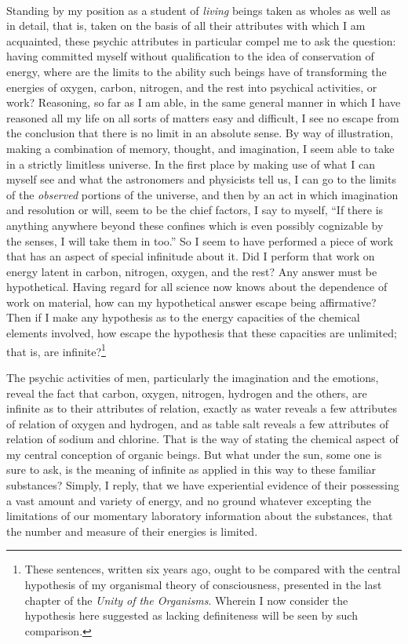 \documentclass[a4paper, 11pt, oneside, polutonikogreek, english]{article}
\begin{document}
\paragraph{}
Standing by my position as a student of \emph{living} beings taken as wholes as well as in detail, that is, taken on the basis of all their attributes with which I am acquainted, these psychic attributes in particular compel me to ask the question: having committed myself without qualification to the idea of conservation of energy, where are the limits to the ability such beings have of transforming the energies of oxygen, carbon, nitrogen, and the rest into psychical activities, or work? Reasoning, so far as I am able, in the same general manner in which I have reasoned all my life on all sorts of matters easy and difficult, I see no escape from the conclusion that there is no limit in an absolute sense. By way of illustration, making a combination of memory, thought, and imagination, I seem able to take in a strictly limitless universe. In the first place by making use of what I can myself see and what the astronomers and physicists tell us, I can go to the limits of the \emph{observed} portions of the universe, and then by an act in which imagination and resolution or will, seem to be the chief factors, I say to myself, ``If there is anything anywhere beyond these confines which is even possibly cognizable by the senses, I will take them in too.'' So I seem to have performed a piece of work that has an aspect of special infinitude about it. Did I perform that work on energy latent in carbon, nitrogen, oxygen, and the rest? Any answer must be hypothetical. Having regard for all science now knows about the dependence of work on material, how can my hypothetical answer escape being affirmative? Then if I make any hypothesis as to the energy capacities of the chemical elements involved, how escape the hypothesis that these capacities are unlimited; that is, are infinite?\footnote{These sentences, written six years ago, ought to be compared with the central hypothesis of my organismal theory of consciousness, presented in the last chapter of the \emph{Unity of the Organisms}. Wherein I now consider the hypothesis here suggested as lacking definiteness will be seen by such comparison.}

The psychic activities of men, particularly the imagination and the emotions, reveal the fact that carbon, oxygen, nitrogen, hydrogen and the others, are infinite as to their attributes of relation, exactly as water reveals a few attributes of relation of oxygen and hydrogen, and as table salt reveals a few attributes of relation of sodium and chlorine. That is the way of stating the chemical aspect of my central conception of organic beings. But what under the sun, some one is sure to ask, is the meaning of infinite as applied in this way to these familiar substances? Simply, I reply, that we have experiential evidence of their possessing a vast amount and variety of energy, and no ground whatever excepting the limitations of our momentary laboratory information about the substances, that the number and measure of their energies is limited.
\end{document}
